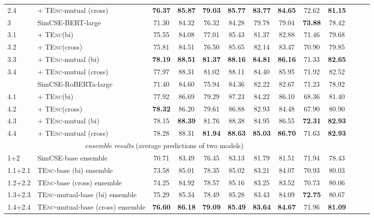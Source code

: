 \documentclass{article} \usepackage{iclr2021_conference,times}
\newcommand{\tenc}{\textsc{TEnc}\xspace}
\begin{document}
\begin{table}[!t]
\begin{tabular}{llccccccccccc}
\rowcolor{blue!5}
2.4 & + \tenc-mutual (cross) & \textbf{76.37} & \textbf{85.87} & \textbf{79.03} & \textbf{85.77} & \textbf{83.77} & \textbf{84.65} & 72.62 & \textbf{81.15} \\
\cmidrule[.5pt]{1-10}
3 & SimCSE-BERT-large & 71.30 & 84.32 & 76.32 & 84.28 & 79.78 & 79.04 & \textbf{73.88} & 78.42 \\ 
3.1 & + \tenc (bi) & 75.55 & 84.08 & 77.01 & 85.43 & 81.37 & 82.88 & 71.46 & 79.68 \\
3.2 &+ \tenc (cross) & 75.81 & 84.51 & 76.50 & 85.65 & 82.14 & 83.47 & 70.90 & 79.85 \\
\rowcolor{red!5}
3.3 &+ \tenc-mutual (bi) & \textbf{78.19} & \textbf{88.51} & \textbf{81.37} & \textbf{88.16} & \textbf{84.81} & \textbf{86.16} & 71.33 & \textbf{82.65} \\
\rowcolor{red!5}
3.4 & + \tenc-mutual (cross) & 77.97 & 88.31 & 81.02 & 88.11 & 84.40 & 85.95 & 71.92 & 82.52 \\
\hdashline
4 & SimCSE-RoBERTa-large & 71.40 & 84.60 & 75.94 & 84.36 & 82.22 & 82.67 & 71.23 & 78.92 \\
4.1 & + \tenc (bi) & 77.92 & 86.69 & 79.29 & 87.23 & 84.22 & 86.10 & 68.36 & 81.40 \\
4.2 & + \tenc (cross) &  \textbf{78.32} & 86.20 & 79.61 & 86.88 & 82.93 & 84.48 & 67.90 & 80.90 \\
\rowcolor{red!5}
4.3 & + \tenc-mutual (bi) & 78.15 & \textbf{88.39} & 81.76 & 88.38 & 84.95 & 86.55 & \textbf{72.31} & \textbf{82.93}  \\
\rowcolor{red!5}
4.4 & + \tenc-mutual (cross) & 78.28 & 88.31 & \textbf{81.94} & \textbf{88.63} & \textbf{85.03} & \textbf{86.70} & 71.63 & \textbf{82.93} \\
\cmidrule[1.5pt]{1-10}
\multicolumn{9}{c}{\textit{ensemble results} (average predictions of two models)} \\
\cmidrule[1.0pt]{1-10}
1+2 & SimCSE-base ensemble & 70.71 & 83.49 & 76.45 & 83.13 & 81.79 & 81.51 & 71.94 & 78.43 \\
1.1+2.1 &\tenc-base (bi) ensemble & 73.58 & 85.01 & 78.35 & 85.02 & 83.21 & 84.07 & 70.93 & 80.03 \\
1.2+2.2 & \tenc-base (cross) ensemble &  74.25 & 84.92 & 78.57 & 85.16 & 83.25 & 83.52 & 70.73 & 80.06 \\
\rowcolor{blue!5}
1.3+2.3 & \tenc-mutual-base (bi) ensemble & 75.29 & 85.34 & 78.49 & 85.28 & 83.43 & 84.09 & \textbf{72.75} & 80.67\\
\rowcolor{blue!5}
1.4+2.4 & \tenc-mutual-base (cross) ensemble &  \textbf{76.60} & \textbf{86.18} & \textbf{79.09} & \textbf{85.49} & \textbf{83.64} & \textbf{84.67} & 71.96 & \textbf{81.09} \\

\end{tabular}
\end{table}
\end{document}
